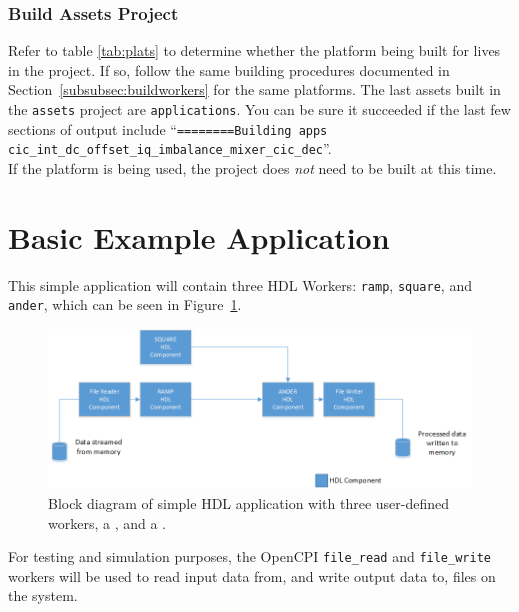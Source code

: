 \subsubsection{Build Assets Project}
Refer to table \ref{tab:plats} to determine whether the platform being built for lives in the  project. If so, follow the same building procedures documented in Section~\ref{subsubsec:buildworkers} for the same platforms. The last assets built in the \texttt{assets} project are \texttt{applications}. You can be sure it succeeded if the last few sections of output include ``\texttt{========Building apps cic\_int\_dc\_offset\_iq\_imbalance\_mixer\_cic\_dec}''.\\

If the  platform is being used, the  project does \textit{not} need to be built at this time.\\

\newpage
\section{Basic Example Application}
\label{sec:basic_example}
This simple application will contain three HDL Workers: \verb+ramp+, \verb+square+, and \verb+ander+, which can be seen in Figure~\ref{fig:simple_app_diagram}. \newline

\begin{figure}[h]
        \centering
        \includegraphics[scale=0.5]{./figures/simple_app_block_diagram.png}
        \caption{Block diagram of simple HDL application with three user-defined workers, a , and a .}
        \label{fig:simple_app_diagram}
\end{figure}
For testing and simulation purposes, the OpenCPI \verb+file_read+ and \verb+file_write+ workers will be used to read input data from, and write output data to, files on the system.\newline

